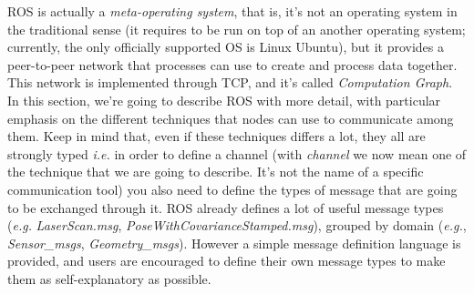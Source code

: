 \ac{ROS} is actually a \textit{meta-operating system}, that is, it's not an operating system in the traditional sense (it requires to be run on top of an another operating system; currently, the only officially supported OS is Linux Ubuntu), but it provides a peer-to-peer network that processes can use to create and process data together. This network is implemented through TCP, and it's called \textit{Computation Graph}. In this section, we're going to describe \ac{ROS} with more detail, with particular emphasis on the different techniques that nodes can use to communicate among them. Keep in mind that, even if these techniques differs a lot, they all are strongly typed \textit{i.e.} in order to define a channel (with \textit{channel} we now mean one of the technique that we are going to describe. It's not the name of a specific communication tool) you also need to define the types of message that are going to be exchanged through it. \ac{ROS} already defines a lot of useful message types (\textit{e.g.} \textit{LaserScan.msg}, \textit{PoseWithCovarianceStamped.msg}), grouped by domain (\textit{e.g.}, \textit{Sensor\_msgs}, \textit{Geometry\_msgs}). However a simple message definition language is provided, and users are encouraged to define their own message types to make them as self-explanatory as possible.

